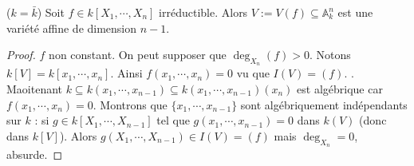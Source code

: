         \begin{lemm}
            ($k = \bar k$) Soit $f \in k[X_1, \cdots, X_n]$ irréductible. Alors $V := V(f) \subseteq \mathbb{A}_k^n$ est une variété affine de dimension $n-1$.
        \end{lemm}
        \begin{proof}
            $f$ non constant. On peut supposer que $\deg_{X_n}(f) > 0$. Notons $k[V] = k[x_1, \cdots, x_n]$. Ainsi $f(x_1, \cdots, x_n) = 0$ vu que $I(V) = (f)$. . Maoitenant $k \subseteq k(x_1, \cdots, x_{n-1}) \subseteq k(x_1, \cdots, x_{n-1})(x_n)$ est algébrique car $f(x_1, \cdots, x_n) = 0$. Montrons que $\{x_1, \cdots, x_{n-1}\}$ sont algébriquement indépendants sur $k$ : si $g \in k[X_1, \cdots, X_{n-1}]$ tel que $g(x_1, \cdots, x_{n-1}) = 0$ dans $k(V)$ (donc dans $k[V]$). Alors $g(X_1, \cdots, X_{n-1}) \in I(V) = (f)$ mais $\deg_{X_n} = 0$, absurde.
        \end{proof}